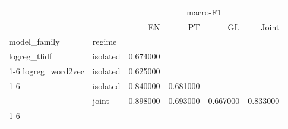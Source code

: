 \begin{tabular}{llrrrr}
\toprule
 &  & \multicolumn{4}{c}{macro-F1} \\
 &  & EN & PT & GL & Joint \\
model\_family & regime &  &  &  &  \\
\midrule
logreg\_tfidf & isolated & 0.674000 &  &  &  \\
\cline{1-6}
logreg\_word2vec & isolated & 0.625000 &  &  &  \\
\cline{1-6}
\multirow[t]{2}{*}{mBERT} & isolated & 0.840000 & 0.681000 &  &  \\
 & joint & 0.898000 & 0.693000 & 0.667000 & 0.833000 \\
\cline{1-6}
\bottomrule
\end{tabular}
